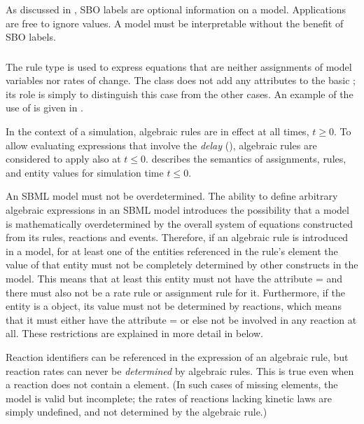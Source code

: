 As discussed in , SBO labels are optional
information on a model.  Applications are free to ignore
 values.  A model must be interpretable without the
benefit of SBO labels.


\subsubsection{}
\label{sec:algebraicrule}

The rule type \AlgebraicRule is used to express equations that are
neither assignments of model variables nor rates of change.  The
\AlgebraicRule class does not add any attributes to the basic
\Rule; its role is simply to distinguish this case from the other
cases.  An example of the use of \AlgebraicRule is given in
.

In the context of a simulation, algebraic rules are in effect at
all times, $t \geq 0$.  To allow evaluating expressions that
involve the \emph{delay} 
(), algebraic rules are considered
to apply also at $t \leq 0$.  
describes the semantics of assignments, rules, and entity values
for simulation time $t \leq 0$.

An SBML model must not be overdetermined.  The ability to define
arbitrary algebraic expressions in an SBML model introduces the
possibility that a model is mathematically overdetermined by the
overall system of equations constructed from its rules, reactions
and events.  Therefore, if an algebraic rule is introduced in a
model, for at least one of the entities referenced in the rule's
 element the value of that entity must not be
completely determined by other constructs in the model.  This
means that at least this entity must not have the attribute
= and there must also not be a rate rule
or assignment rule for it.  Furthermore, if the entity is a
\Species object, its value must not be determined by reactions,
which means that it must either have the attribute
= or else not be involved in
any reaction at all.  These restrictions are explained in more
detail in  below.

Reaction identifiers can be referenced in the  
expression of an algebraic rule, but reaction rates can never be
\emph{determined} by algebraic rules.  This is true even when a
reaction does not contain a \KineticLaw element.  (In such cases
of missing \KineticLaw elements, the model is valid but 
incomplete; the rates of reactions lacking kinetic laws are
simply undefined, and not determined by the algebraic rule.)

